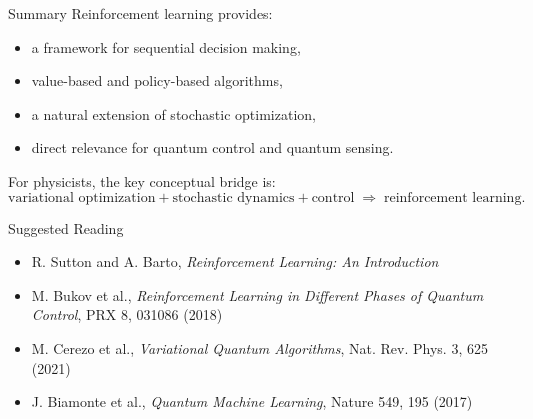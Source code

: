 \documentclass{beamer}
\begin{document}
\begin{frame}{Summary}
  Reinforcement learning provides:
  \begin{itemize}
  \item a framework for sequential decision making,
  \item value-based and policy-based algorithms,
  \item a natural extension of stochastic optimization,
  \item direct relevance for quantum control and quantum sensing.
  \end{itemize}

  For physicists, the key conceptual bridge is:
  \[
  \text{variational optimization} + \text{stochastic dynamics} + \text{control}
  \;\Rightarrow\; \text{reinforcement learning}.
  \]
\end{frame}

\begin{frame}{Suggested Reading}
  \begin{itemize}
  \item R. Sutton and A. Barto, \emph{Reinforcement Learning: An Introduction}
  \item M. Bukov et al., \emph{Reinforcement Learning in Different Phases of Quantum Control}, PRX 8, 031086 (2018)
  \item M. Cerezo et al., \emph{Variational Quantum Algorithms}, Nat. Rev. Phys. 3, 625 (2021)
  \item J. Biamonte et al., \emph{Quantum Machine Learning}, Nature 549, 195 (2017)
  \end{itemize}
\end{frame}
\end{document}
